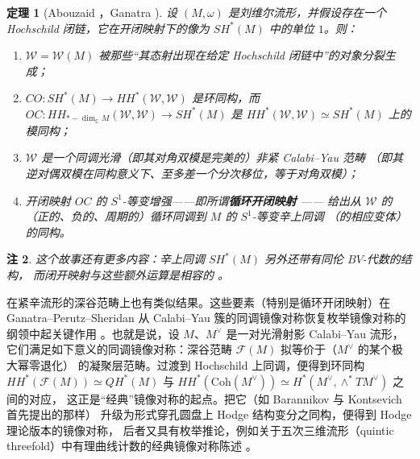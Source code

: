 \documentclass[UTF8,a4paper,11pt,fontset=windows]{ctexart}
\theoremstyle{cnthm}
\newtheorem{thm}{定理}[section]
\newtheorem{rem}[thm]{注}
\numberwithin{equation}{section}
\newcommand{\C}{\mathbb{C}}
\newcommand{\SH}{SH}                  %
\newcommand{\HH}{HH}                  %
\newcommand{\WW}{\mathcal{W}}         %
\newcommand{\FF}{\mathcal{F}}         %
\begin{document}
\begin{thm}[Abouzaid \cite{r1}，Ganatra \cite{r52,r53}]\label{thm:2.7}
设 $(M,\omega)$ 是刘维尔流形，并假设存在一个 Hochschild 闭链，它在开闭映射下的像为
$\SH^{*}(M)$ 中的单位 $1$。则：
\begin{enumerate}[leftmargin=1.8em,itemsep=2pt,topsep=2pt,label=(\arabic*)]
  \item $\WW=\WW(M)$ 被那些“其态射出现在给定 Hochschild 闭链中”的对象分裂生成；
  \item $CO:\SH^{*}(M)\to\HH^{*}(\WW,\WW)$ 是环同构，而
        $OC:\HH_{*-\dim_{\C}M}(\WW,\WW)\to\SH^{*}(M)$ 是
        $\HH^{*}(\WW,\WW)\simeq\SH^{*}(M)$ 上的模同构；
  \item $\WW$ 是一个同调光滑（即其对角双模是完美的）非紧 Calabi--Yau 范畴
        （即其逆对偶双模在同构意义下、至多差一个分次移位，等于对角双模）；
  \item 开闭映射 $OC$ 的 $S^{1}$-等变增强——即所谓\textbf{循环开闭映射} \cite{r53}——
        给出从 $\WW$ 的（正的、负的、周期的）循环同调到 $M$ 的 $S^{1}$-等变辛上同调
        （的相应变体）的同构。
\end{enumerate}
\end{thm}


\begin{rem}\label{rem:2.8}
这个故事还有更多内容：辛上同调 $\SH^{*}(M)$ 另外还带有同伦 $BV$-代数的结构，
而闭开映射与这些额外运算是相容的 \cite{r10,r28}。
\end{rem}

在紧辛流形的深谷范畴上也有类似结果。这些要素（特别是循环开闭映射）在
Ganatra--Perutz--Sheridan 从 Calabi--Yau 簇的同调镜像对称恢复枚举镜像对称的纲领中起关键作用
\cite{r59}。也就是说，设 $M$、$M^{\vee}$ 是一对光滑射影 Calabi--Yau 流形，
它们满足如下意义的同调镜像对称：深谷范畴 $\FF(M)$ 拟等价于（$M^{\vee}$ 的某个极大幂零退化）
的凝聚层范畴。过渡到 Hochschild 上同调，便得到环同构
$\HH^{*}(\FF(M))\simeq QH^{*}(M)$ 与
$\HH^{*}(\mathrm{Coh}(M^{\vee}))\simeq H^{*}(M^{\vee},\wedge^{*}TM^{\vee})$ 之间的对应，
这正是“经典”镜像对称的起点。把它（如 Barannikov 与 Kontsevich 首先提出的那样）
升级为形式穿孔圆盘上 Hodge 结构变分之同构，便得到 Hodge 理论版本的镜像对称，
后者又具有枚举推论，例如关于五次三维流形（quintic threefold）中有理曲线计数的经典镜像对称陈述 \cite{r59}。
\end{document}
